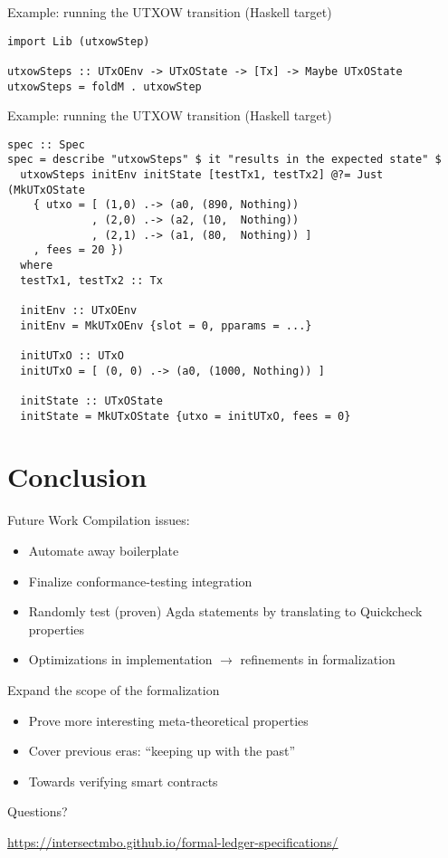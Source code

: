 \documentclass[aspectratio=169]{beamer}
\renewcommand\alert[1]{\textcolor{mLightBrown}{#1}}
\begin{document}
\begin{frame}[fragile]{Example: \alert{running} the UTXOW transition (\alert{Haskell} target)}
\begin{verbatim}
import Lib (utxowStep)

utxowSteps :: UTxOEnv -> UTxOState -> [Tx] -> Maybe UTxOState
utxowSteps = foldM . utxowStep
\end{verbatim}
\end{frame}
\begin{frame}[fragile]{Example: \alert{running} the UTXOW transition (\alert{Haskell} target)}
\begin{verbatim}
spec :: Spec
spec = describe "utxowSteps" $ it "results in the expected state" $
  utxowSteps initEnv initState [testTx1, testTx2] @?= Just (MkUTxOState
    { utxo = [ (1,0) .-> (a0, (890, Nothing))
             , (2,0) .-> (a2, (10,  Nothing))
             , (2,1) .-> (a1, (80,  Nothing)) ]
    , fees = 20 })
  where
  testTx1, testTx2 :: Tx

  initEnv :: UTxOEnv
  initEnv = MkUTxOEnv {slot = 0, pparams = ...}

  initUTxO :: UTxO
  initUTxO = [ (0, 0) .-> (a0, (1000, Nothing)) ]

  initState :: UTxOState
  initState = MkUTxOState {utxo = initUTxO, fees = 0}
\end{verbatim}
\end{frame}

\section{Conclusion}
\begin{frame}{Future Work}
Compilation issues:
  \begin{itemize}
  \item Automate away \alert{boilerplate}
  \item Finalize \alert{conformance-testing} integration
  \item Randomly test (proven) Agda statements by translating
    to \alert{Quickcheck} properties
  \item Optimizations in implementation $\to$ \alert{refinements} in formalization
  \end{itemize}

\pause
Expand the scope of the formalization
  \begin{itemize}
  \item Prove more interesting meta-theoretical \alert{properties}
  \item Cover previous \alert{eras}: ``keeping up with the past''
  \item Towards verifying \alert{smart contracts}
  \end{itemize}
\end{frame}
\begin{frame}[standout]
Questions?
\vfill
\begin{center}
\alert{\url{https://intersectmbo.github.io/formal-ledger-specifications/}}
\end{center}
\end{frame}
\end{document}
